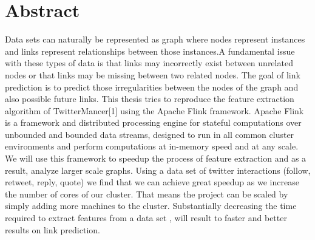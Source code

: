\chapter*{\Large \center Abstract}

Data sets can naturally be represented as graph where nodes represent instances and links represent relationships between those instances.A fundamental issue with these types of data is that links may incorrectly exist between unrelated nodes or that links may be missing between two related nodes. The goal of link prediction is to predict those irregularities between the nodes of the graph and also possible future links. \newline 
This thesis tries to reproduce the feature extraction algorithm of TwitterMancer[1] using the Apache Flink framework. Apache Flink is a framework and distributed processing engine for stateful computations over unbounded and bounded data streams, designed to run in all common cluster environments and perform computations at in-memory speed and at any scale. We will use this framework to speedup the process of feature extraction and as a result, analyze larger scale graphs.\newline
Using a data set of twitter interactions (follow, retweet, reply, quote) we find that we can achieve great speedup as we increase the number of cores of our cluster. That means the project can be scaled by simply adding more machines to the cluster. Substantially decreasing the time required to extract features from a data set , will result to faster and better results on link prediction.